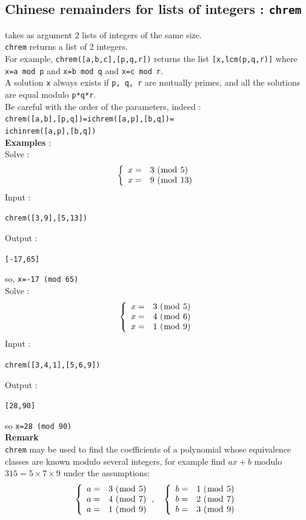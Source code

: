 \documentclass[a4paper,11pt]{book}
\begin{document}
\subsection{Chinese remainders for lists of integers  : {\tt chrem}}
 takes as argument 2 lists of integers of the same size.\\
{\tt chrem} returns a list of 2 integers.\\
For example, {\tt chrem([a,b,c],[p,q,r])} returns the list 
{\tt [x,lcm(p,q,r)]} where
{\tt x=a mod  p} and {\tt x=b mod q} and {\tt x=c mod r}.\\
A solution {\tt x} always exists if {\tt p, q, r} 
are mutually primes, and all the solutions are equal modulo {\tt p*q*r}. \\
{\sc Be careful} with the order of the parameters, indeed :\\
{\tt chrem([a,b],[p,q])=ichrem([a,p],[b,q])=\\
ichinrem([a,p],[b,q])}\\
{\bf Examples} : \\
Solve :
$${\tt \left \{ \begin{array}{rl} x=&3\ (\bmod\ 5)\\ 
x=&9\ (\bmod\ 13) \end{array}\right.}$$
Input :
\begin{center}{\tt chrem([3,9],[5,13])}\end{center}
Output :
\begin{center}{\tt [-17,65] }\end{center}
so, {\tt x=-17 (mod 65)}\\
Solve :
$${\tt \left \{ \begin{array}{rl} x=&3\ (\bmod\ 5)\\ 
x=&4\ (\bmod\ 6) \\ 
x=&1\ (\bmod\ 9)\end{array}\right.}$$
Input :
\begin{center}{\tt chrem([3,4,1],[5,6,9])}\end{center}
Output :
\begin{center}{\tt [28,90] }\end{center}
so {\tt x=28 (mod 90)}\\
{\bf Remark}\\
{\tt chrem} may be used to find the coefficients of a polynomial whose
equivalence classes are known modulo several integers, for example find
$ax+b$ modulo $315=5 \times 7 \times 9$ under the assumptions:
$${\tt \left \{ \begin{array}{rl} a=&3\ (\bmod\ 5)\\ 
a=&4\ (\bmod\ 7) \\ 
a=&1\ (\bmod\ 9) \end{array}\right.}, \quad
{\tt \left \{ \begin{array}{rl} b=&1\ (\bmod\ 5)\\ 
b=&2\ (\bmod\ 7) \\ 
b=&3\ (\bmod\ 9) \end{array}\right.}$$
\end{document}
